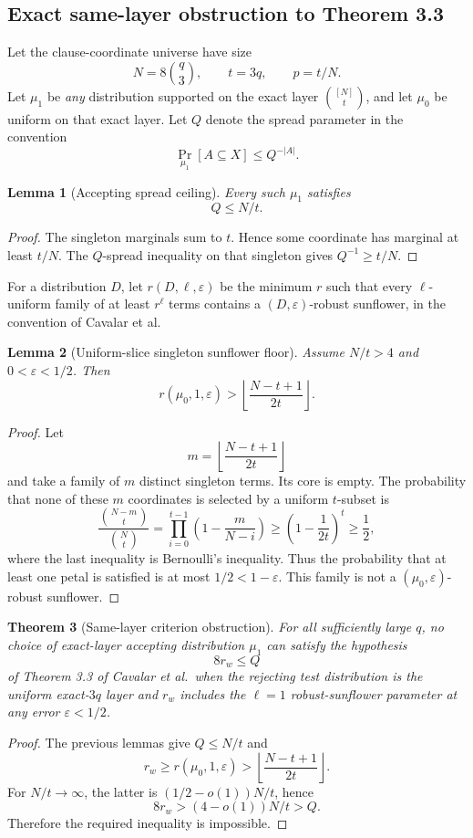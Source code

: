 \documentclass[11pt]{article}
\newtheorem{theorem}{Theorem}
\newtheorem{lemma}[theorem]{Lemma}
\begin{document}
\subsection{Exact same-layer obstruction to Theorem 3.3}
Let the clause-coordinate universe have size
\[
N=8\binom q3,\qquad t=3q,\qquad p=t/N.
\]
Let $\mu_1$ be \emph{any} distribution supported on the exact layer $\binom{[N]}t$, and let $\mu_0$ be uniform on that exact layer. Let $Q$ denote the spread parameter in the convention
\[
\Pr_{\mu_1}[A\subseteq X]\le Q^{-|A|}.
\]

\begin{lemma}[Accepting spread ceiling]
Every such $\mu_1$ satisfies
\[
Q\le N/t.
\]
\end{lemma}
\begin{proof}
The singleton marginals sum to $t$. Hence some coordinate has marginal at least $t/N$. The $Q$-spread inequality on that singleton gives $Q^{-1}\ge t/N$.
\end{proof}

For a distribution $D$, let $r(D,\ell,\varepsilon)$ be the minimum $r$ such that every $\ell$-uniform family of at least $r^\ell$ terms contains a $(D,\varepsilon)$-robust sunflower, in the convention of Cavalar et al.

\begin{lemma}[Uniform-slice singleton sunflower floor]
Assume $N/t>4$ and $0<\varepsilon<1/2$. Then
\[
r(\mu_0,1,\varepsilon)>
\left\lfloor\frac{N-t+1}{2t}\right\rfloor.
\]
\end{lemma}
\begin{proof}
Let
\[
m=\left\lfloor\frac{N-t+1}{2t}\right\rfloor
\]
and take a family of $m$ distinct singleton terms. Its core is empty. The probability that none of these $m$ coordinates is selected by a uniform $t$-subset is
\[
\frac{\binom{N-m}{t}}{\binom Nt}
=\prod_{i=0}^{t-1}\left(1-\frac{m}{N-i}\right)
\ge
\left(1-\frac1{2t}\right)^t
\ge\frac12,
\]
where the last inequality is Bernoulli's inequality. Thus the probability that at least one petal is satisfied is at most $1/2<1-\varepsilon$. This family is not a $(\mu_0,\varepsilon)$-robust sunflower.
\end{proof}

\begin{theorem}[Same-layer criterion obstruction]
For all sufficiently large $q$, no choice of exact-layer accepting distribution $\mu_1$ can satisfy the hypothesis
\[
8r_w\le Q
\]
of Theorem 3.3 of Cavalar et al.\ when the rejecting test distribution is the uniform exact-$3q$ layer and $r_w$ includes the $\ell=1$ robust-sunflower parameter at any error $\varepsilon<1/2$.
\end{theorem}
\begin{proof}
The previous lemmas give $Q\le N/t$ and
\[
r_w\ge r(\mu_0,1,\varepsilon)>
\left\lfloor\frac{N-t+1}{2t}\right\rfloor.
\]
For $N/t\to\infty$, the latter is $(1/2-o(1))N/t$, hence
\[
8r_w>(4-o(1))N/t>Q.
\]
Therefore the required inequality is impossible.
\end{proof}
\end{document}
